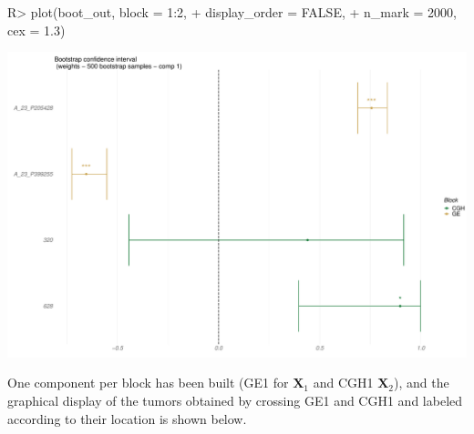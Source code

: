 \documentclass[
]{jss}
\begin{document}
\begin{CodeChunk}
\begin{CodeInput}
R> plot(boot_out, block = 1:2, 
+      display_order = FALSE, 
+      n_mark = 2000, cex = 1.3)
\end{CodeInput}


\begin{center}\includegraphics{RGCCA_21022023_files/figure-latex/unnamed-chunk-52-1} \end{center}

\end{CodeChunk}

\normalsize

One component per block has been built (GE1 for \(\mathbf{X}_1\) and
CGH1 \(\mathbf{X}_2\)), and the graphical display of the tumors obtained
by crossing GE1 and CGH1 and labeled according to their location is
shown below.

\footnotesize
\end{document}
